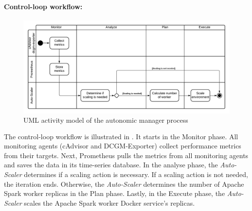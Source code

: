 \paragraph{Control-loop workflow:}
\begin{figure}[h]
\centering
\includegraphics[scale=0.50]{images/05_conceptual_design/autonomic_manager/autonomic_manager_workflow}
\caption{UML activity model of the autonomic manager process}
\label{fig:05_am_monitoring_loop_workflow}
\end{figure}
The control-loop workflow is illustrated in .
It starts in the Monitor phase. All monitoring agents (cAdvisor and DCGM-Exporter) collect performance metrics from their targets. Next, Prometheus pulls the metrics from all monitoring agents and saves the data in its time-series database.
In the analyse phase, the \textit{Auto-Scaler} determines if a scaling action is necessary. If a scaling action is not needed, the iteration ends.
Otherwise, the \textit{Auto-Scaler} determines the number of Apache Spark worker replicas in the Plan phase.
Lastly, in the Execute phase, the \textit{Auto-Scaler} scales the Apache Spark worker Docker service's replicas.


